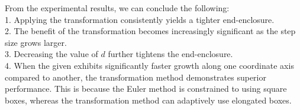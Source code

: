 {	From the experimental results, we can conclude the following:  
	\\ 1. Applying the transformation consistently yields a tighter
	end-enclosure.  
	\\ 2. The benefit of the transformation becomes increasingly
	significant as the step size grows larger.  
	\\ 3. Decreasing the value of $d$ further tightens the end-enclosure.  
	\\ 4. When the given \ivp exhibits significantly faster growth along
	one coordinate axis compared to another, the transformation method
	demonstrates superior performance. This is because the Euler method is
	constrained to using square boxes, whereas the transformation method
	can adaptively use elongated boxes.  


}

